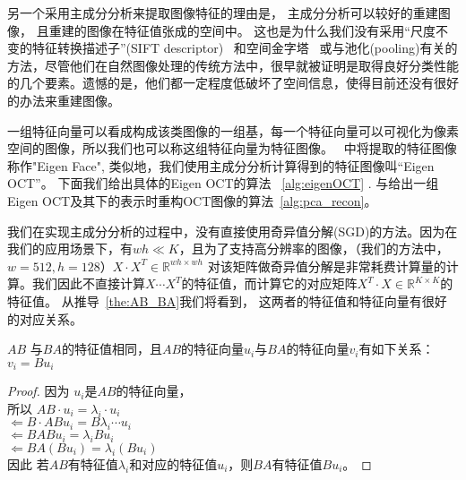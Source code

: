         另一个采用主成分分析来提取图像特征的理由是， 主成分分析可以较好的重建图像， 且重建的图像在特征值张成的空间中。  这也是为什么我们没有采用“尺度不变的特征转换描述子”(SIFT descriptor) ~\cite{yang2009linear}和空间金字塔~\cite{lazebnik2006beyond} 或与池化(pooling)有关的方法，尽管他们在自然图像处理的传统方法中，很早就被证明是取得良好分类性能的几个要素。遗憾的是，他们都一定程度低破坏了空间信息，使得目前还没有很好的办法来重建图像。

        一组特征向量可以看成构成该类图像的一组基，每一个特征向量可以可视化为像素空间的图像，所以我们也可以称这组特征向量为特征图像。~\cite{turk1991eigenfaces} 中将提取的特征图像称作"Eigen Face", 类似地，我们使用主成分分析计算得到的特征图像叫“Eigen OCT”。 下面我们给出具体的Eigen OCT的算法 ~\ref{alg:eigenOCT}  . 与给出一组Eigen OCT及其下的表示时重构OCT图像的算法~\ref{alg:pca_recon}。

        我们在实现主成分分析的过程中，没有直接使用奇异值分解(SGD)的方法。因为在我们的应用场景下，有$wh \ll K$，且为了支持高分辨率的图像，（我们的方法中，$w = 512, h = 128$）$X\cdot X^T \in \mathbb{R}^{wh \times wh}$ 对该矩阵做奇异值分解是非常耗费计算量的计算。我们因此不直接计算$X\cdots  X^T$的特征值，而计算它的对应矩阵$X^T \cdot X \in \mathbb{R} ^{K \times K}$的特征值。 从推导~\ref{the:AB_BA}我们将看到， 这两者的特征值和特征向量有很好的对应关系。

        \begin{theorem}\label{the:AB_BA}
            $AB$ 与$BA$的特征值相同，且$AB$的特征向量$u_i$与$BA$的特征向量$v_i$有如下关系：$v_i = Bu_i$
        \end{theorem}
        \begin{proof}
        
            因为 $u_i$是$AB$的特征向量，\\
            所以  $AB \cdot u_i = \lambda_i \cdot u_i$\\
            $\Leftarrow B\cdot AB u_i = B \lambda_i \cdots u_i$\\
            $\Leftarrow BAB u_i = \lambda_i B u_i$\\
            $\Leftarrow BA(Bu_i)= \lambda_i (Bu_i)$\\
            因此 若$AB$有特征值$\lambda_i$和对应的特征值$u_i$，则$BA$有特征值$Bu_i$。
        
        \end{proof}


